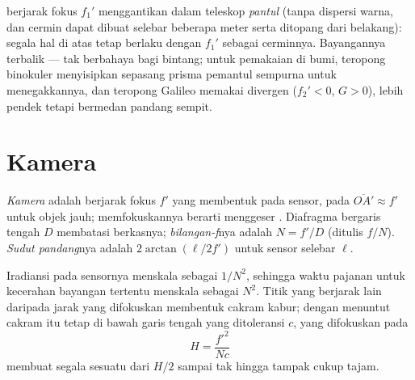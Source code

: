 \begin{remark}\label{rem:b1:optical-instruments:variants}
 berjarak fokus $f_1'$ menggantikan  dalam
teleskop \emph{pantul} (tanpa dispersi warna, dan cermin dapat dibuat
selebar beberapa meter serta ditopang dari belakang): segala hal di atas
tetap berlaku dengan $f_1'$ sebagai  cerminnya. Bayangannya
terbalik --- tak berbahaya bagi bintang; untuk pemakaian di bumi,
teropong binokuler menyisipkan sepasang prisma pemantul sempurna untuk
menegakkannya, dan teropong Galileo memakai  divergen
($f_2' < 0$, $G > 0$), lebih pendek tetapi bermedan pandang sempit.
\end{remark}

\section{Kamera}

\begin{definition}\label{def:b1:optical-instruments:camera}
\emph{Kamera} adalah  berjarak fokus $f'$ yang membentuk
 pada sensor, pada $\overline{OA'} \approx f'$ untuk objek
jauh; memfokuskannya berarti menggeser . Diafragma bergaris
tengah $D$ membatasi berkasnya; \emph{bilangan-f}nya adalah
$N = f'/D$ (ditulis $f/N$). \emph{Sudut pandang}nya adalah
$2\arctan(\ell/2f')$ untuk sensor selebar $\ell$.
\end{definition}

\begin{proposition}\label{prop:b1:optical-instruments:dof}
Iradiansi pada sensornya menskala sebagai $1/N^2$, sehingga waktu
pajanan untuk kecerahan bayangan tertentu menskala sebagai $N^2$. Titik
yang berjarak lain daripada jarak yang difokuskan membentuk cakram
kabur; dengan menuntut cakram itu tetap di bawah garis tengah yang
ditoleransi $c$,  yang difokuskan pada \emph{}
\[
H = \frac{f'^2}{N c}
\]
membuat segala sesuatu dari $H/2$ sampai tak hingga tampak cukup tajam.
\end{proposition}

